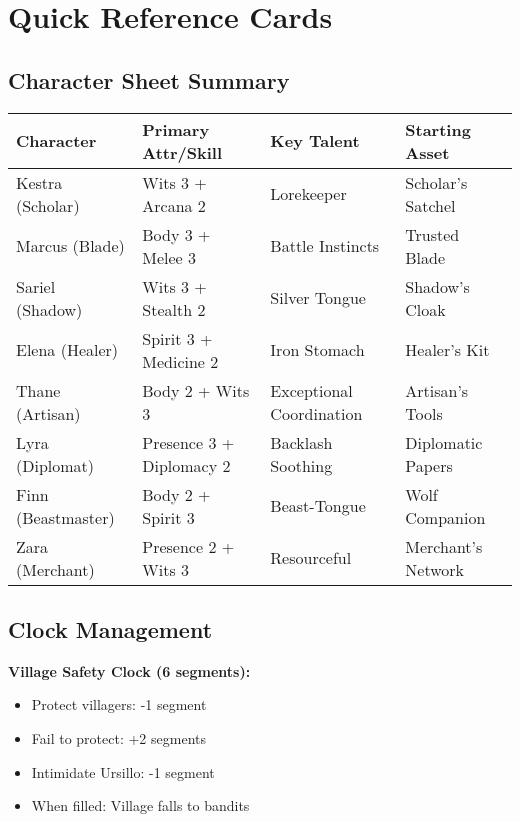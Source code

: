 \documentclass[11pt]{article}
\newcommand{\checkmark}{\ding{51}}
\begin{document}
\section{Quick Reference Cards}

\subsection{Character Sheet Summary}

\begin{center}
\begin{tabular}{|l|l|l|l|}
\hline
\textbf{Character} & \textbf{Primary Attr/Skill} & \textbf{Key Talent} & \textbf{Starting Asset} \\
\hline
Kestra (Scholar) & Wits 3 + Arcana 2 & Lorekeeper & Scholar's Satchel \\
Marcus (Blade) & Body 3 + Melee 3 & Battle Instincts & Trusted Blade \\
Sariel (Shadow) & Wits 3 + Stealth 2 & Silver Tongue & Shadow's Cloak \\
Elena (Healer) & Spirit 3 + Medicine 2 & Iron Stomach & Healer's Kit \\
Thane (Artisan) & Body 2 + Wits 3 & Exceptional Coordination & Artisan's Tools \\
Lyra (Diplomat) & Presence 3 + Diplomacy 2 & Backlash Soothing & Diplomatic Papers \\
Finn (Beastmaster) & Body 2 + Spirit 3 & Beast-Tongue & Wolf Companion \\
Zara (Merchant) & Presence 2 + Wits 3 & Resourceful & Merchant's Network \\
\hline
\end{tabular}
\end{center}

\subsection{Clock Management}

\textbf{Village Safety Clock (6 segments):}
\begin{itemize}
\item \checkmark Protect villagers: -1 segment
\item \checkmark Fail to protect: +2 segments
\item \checkmark Intimidate Ursillo: -1 segment
\item When filled: Village falls to bandits
\end{itemize}
\end{document}
